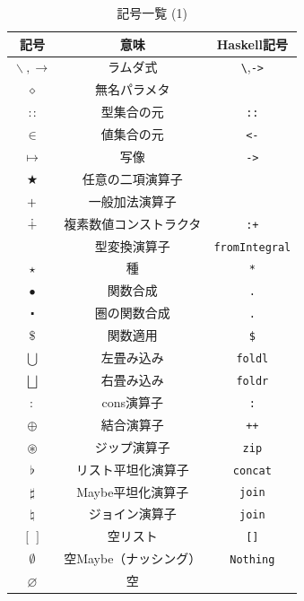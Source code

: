 \documentclass[a5paper,twoside,fleqn,draft]{jsbook}
\newcommand{\programminglanguage}[1]{\textsf{#1}}
\newcommand{\haskell}{\programminglanguage{Haskell}}
\newcommand{\code}[1]{\texttt{#1}}
\newcommand{\mEmptyList}{{[\,]}}
\newcommand{\mNothing}{\emptyset}
\newcommand{\mPureNothing}{\varnothing}
\newcommand{\mAnonParam}{\diamond}
\newcommand{\mUpCast}{\bigtriangleup}
\DeclareMathOperator{\mFromIntegral}{\mUpCast_\text{Integral}}
\DeclareMathOperator{\mAppend}{\oplus}
\DeclareMathOperator{\mApply}{\$}
\DeclareMathOperator{\mApplyRight}{\rightsquigarrow}
\DeclareMathOperator{\mBinOp}{\bigstar}
\DeclareMathOperator{\mComp}{\bullet}
\DeclareMathOperator{\mCompCat}{\centerdot}
\DeclareMathOperator{\mComplexPlus}{\dotplus}
\DeclareMathOperator*{\mFold}{\bigcup}
\DeclareMathOperator*{\mFoldRight}{\bigsqcup}
\DeclareMathOperator{\mIn}{{:\!:}}
\DeclareMathOperator{\mJoin}{\natural}
\DeclareMathOperator{\mJoinList}{\flat} %
\DeclareMathOperator{\mJoinMaybe}{\sharp}
\DeclareMathOperator{\mLambda}{\backslash}
\DeclareMathOperator{\mLambdaArrow}{\rightarrow}
\DeclareMathOperator{\mMapsTo}{\mapsto}
\DeclareMathOperator{\mPlus}{\boldmath{+}} %
\DeclareMathOperator{\mUnOp}{\star}
\DeclareMathOperator{\mZip}{\circledast}
\begin{document}
\begin{table}[p]
\caption{記号一覧 (1)}
\begin{center}
\begin{tabular}{||c|c|c||}
\hline
記号&意味&\haskell 記号\\
\hline\hline
$\mLambda, \mLambdaArrow$&ラムダ式&\code{\textbackslash},\code{->}\\
$\mAnonParam$&無名パラメタ&\\
\hline
$\mIn$&型集合の元&\code{::}\\
$\in$&値集合の元&\code{<-}\\
$\mMapsTo$&写像&\code{->}\\
\hline
$\mBinOp$&任意の二項演算子&\\
$\mPlus$&一般加法演算子&\\
\hline
$\mComplexPlus$&複素数値コンストラクタ&\code{:+}\\
\hline
$\mFromIntegral$&型変換演算子&\code{fromIntegral}\\
$\star$&種&\code{*}\\
\hline
$\mComp$&関数合成&\code{.}\\
$\mCompCat$&圏の関数合成&\code{.}\\
$\mApply$&関数適用&\code{\$}\\
\hline
$\mFold$&左畳み込み&\code{foldl}\\
$\mFoldRight$&右畳み込み&\code{foldr}\\
\hline
$:$&cons演算子&\code{:}\\
$\mAppend$&結合演算子&\code{++}\\
$\mZip$&ジップ演算子&\code{zip}\\
\hline
$\mJoinList$&リスト平坦化演算子&\code{concat}\\
$\mJoinMaybe$&Maybe平坦化演算子&\code{join}\\
$\mJoin$&ジョイン演算子&\code{join}\\
\hline
$\mEmptyList$&空リスト&\code{[]}\\
$\mNothing$&空Maybe（ナッシング）&\code{Nothing}\\
$\mPureNothing$&空&\\
\hline
\end{tabular}
\end{center}
\end{table}
\end{document}
